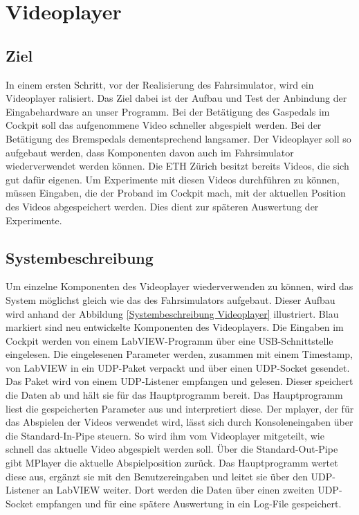 \section{Videoplayer}
\label{sec:videoplayer}

\subsection{Ziel}
In einem ersten Schritt, vor der Realisierung des Fahrsimulator, wird ein Videoplayer ralisiert. Das Ziel dabei ist der Aufbau und Test der Anbindung der Eingabehardware an unser Programm. Bei der Betätigung des Gaspedals im Cockpit soll das aufgenommene Video schneller abgespielt werden. Bei der Betätigung des Bremspedals dementsprechend langsamer. Der Videoplayer soll so aufgebaut werden, dass Komponenten davon auch im Fahrsimulator wiederverwendet werden können. Die ETH Zürich besitzt bereits Videos, die sich gut dafür eigenen. Um Experimente mit diesen Videos durchführen zu können, müssen Eingaben, die der Proband im Cockpit mach, mit der aktuellen Position des Videos abgespeichert werden. Dies dient zur späteren Auswertung der Experimente.
\\
\subsection{Systembeschreibung}

Um einzelne Komponenten des Videoplayer wiederverwenden zu können, wird das System möglichst gleich wie das des Fahrsimulators aufgebaut. Dieser Aufbau wird anhand der Abbildung \ref{Systembeschreibung Videoplayer} illustriert. Blau markiert sind neu entwickelte Komponenten des Videoplayers. Die Eingaben im Cockpit werden von einem LabVIEW-Programm über eine USB-Schnittstelle eingelesen. Die eingelesenen Parameter werden, zusammen mit einem Timestamp, von LabVIEW in ein UDP-Paket verpackt und über einen UDP-Socket gesendet. Das Paket wird von einem UDP-Listener empfangen und gelesen. Dieser speichert die Daten ab und hält sie für das Hauptprogramm bereit. Das Hauptprogramm liest die gespeicherten Parameter aus und interpretiert diese. Der \gls{mplayer}, der für das Abspielen der Videos verwendet wird, lässt sich durch Konsoleneingaben über die Standard-In-Pipe steuern. So wird ihm vom Videoplayer mitgeteilt, wie schnell das aktuelle Video abgespielt werden soll. Über die Standard-Out-Pipe gibt MPlayer die aktuelle Abspielposition zurück. Das Hauptprogramm wertet diese aus, ergänzt sie mit den Benutzereingaben und leitet sie über den UDP-Listener an LabVIEW weiter. Dort werden die Daten über einen zweiten UDP-Socket empfangen und für eine spätere Auswertung in ein Log-File gespeichert.
\newpage

